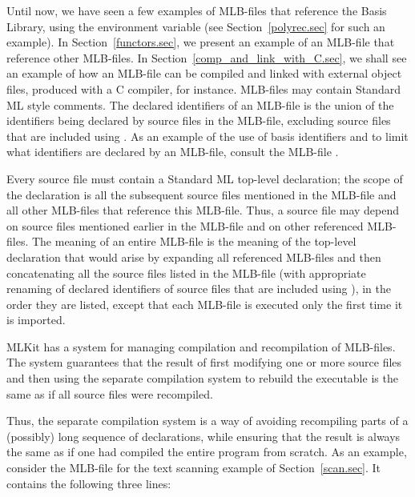 \documentclass[12pt]{book}
\begin{document}
Until now, we have seen a few examples of MLB-files that reference the Basis
Library, using the  environment variable (see
Section~\ref{polyrec.sec} for such an example). In Section~\ref{functors.sec},
we present an example of an MLB-file that reference other MLB-files. In
Section~\ref{comp_and_link_with_C.sec}, we shall see an example of how an
MLB-file can be compiled and linked with external object files, produced with a
C compiler, for instance.  MLB-files may contain Standard ML style
%
%
%
%
comments. The declared identifiers of an MLB-file is the union of the
identifiers being declared by source files in the MLB-file, excluding source
files that are included using . As an example of the use of basis
identifiers and  to limit what identifiers are declared by an
MLB-file, consult the MLB-file .

Every source file must contain a Standard ML top-level declaration; the scope of
the declaration is all the subsequent source files mentioned in the MLB-file and
all other MLB-files that reference this MLB-file. Thus, a source file may depend
on source files mentioned earlier in the MLB-file and on other referenced
MLB-files.  The meaning of an entire MLB-file is the meaning of the top-level
declaration that would arise by expanding all referenced MLB-files and then
concatenating all the source files listed in the MLB-file (with appropriate
renaming of declared identifiers of source files that are included using
), in the order they are listed, except that each MLB-file is executed
only the first time it is imported.

MLKit has a system for managing compilation and recompilation of
%
%
%
MLB-files.  The system guarantees that the result of first modifying one or more
source files and then using the separate compilation system to rebuild the
executable is the same as if all
%
%
%
source files were
%
%
%
recompiled.

Thus, the separate compilation system is a way of avoiding recompiling parts of
a (possibly) long sequence of declarations, while ensuring that the result is
always the same as if one had compiled the entire program from scratch.  As an
example, consider the MLB-file  for the text scanning
example of Section~\ref{scan.sec}. It contains the following three lines:
\end{document}
